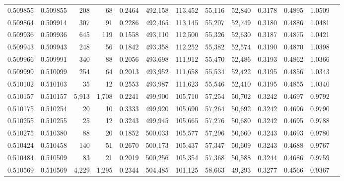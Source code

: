 \begin{tabular}{rrrrrrrrrrrrr}
0.509855 & 0.509855 &   208 &    68 &                                     0.2464 & 492,158 & 113,452 &  55,116 &  52,840 & 0.3178 & 0.4895 & 1.0509 \\
0.509864 & 0.509914 &   307 &    91 &                                     0.2286 & 492,465 & 113,145 &  55,207 &  52,749 & 0.3180 & 0.4886 & 1.0481 \\
0.509936 & 0.509936 &   645 &   119 &                                     0.1558 & 493,110 & 112,500 &  55,326 &  52,630 & 0.3187 & 0.4875 & 1.0421 \\
0.509943 & 0.509943 &   248 &    56 &                                     0.1842 & 493,358 & 112,252 &  55,382 &  52,574 & 0.3190 & 0.4870 & 1.0398 \\
0.509966 & 0.509991 &   340 &    88 &                                     0.2056 & 493,698 & 111,912 &  55,470 &  52,486 & 0.3193 & 0.4862 & 1.0366 \\
0.509999 & 0.510099 &   254 &    64 &                                     0.2013 & 493,952 & 111,658 &  55,534 &  52,422 & 0.3195 & 0.4856 & 1.0343 \\
0.510102 & 0.510103 &    35 &    12 &                                     0.2553 & 493,987 & 111,623 &  55,546 &  52,410 & 0.3195 & 0.4855 & 1.0340 \\
0.510157 & 0.510157 & 5,913 & 1,708 &                                     0.2241 & 499,900 & 105,710 &  57,254 &  50,702 & 0.3242 & 0.4697 & 0.9792 \\
0.510175 & 0.510254 &    20 &    10 &                                     0.3333 & 499,920 & 105,690 &  57,264 &  50,692 & 0.3242 & 0.4696 & 0.9790 \\
0.510255 & 0.510255 &    25 &    12 &                                     0.3243 & 499,945 & 105,665 &  57,276 &  50,680 & 0.3242 & 0.4695 & 0.9788 \\
0.510275 & 0.510380 &    88 &    20 &                                     0.1852 & 500,033 & 105,577 &  57,296 &  50,660 & 0.3243 & 0.4693 & 0.9780 \\
0.510424 & 0.510458 &   140 &    51 &                                     0.2670 & 500,173 & 105,437 &  57,347 &  50,609 & 0.3243 & 0.4688 & 0.9767 \\
0.510484 & 0.510509 &    83 &    21 &                                     0.2019 & 500,256 & 105,354 &  57,368 &  50,588 & 0.3244 & 0.4686 & 0.9759 \\
0.510569 & 0.510569 & 4,229 & 1,295 &                                     0.2344 & 504,485 & 101,125 &  58,663 &  49,293 & 0.3277 & 0.4566 & 0.9367 \\

\end{tabular}
